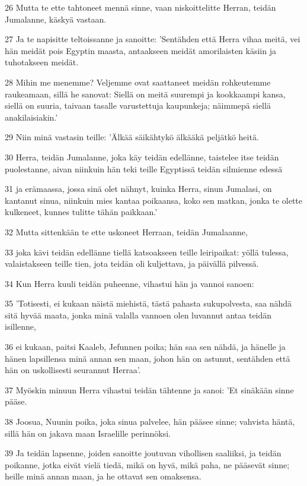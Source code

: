 \par 26 Mutta te ette tahtoneet mennä sinne, vaan niskoittelitte Herran, teidän Jumalanne, käskyä vastaan.
\par 27 Ja te napisitte teltoissanne ja sanoitte: 'Sentähden että Herra vihaa meitä, vei hän meidät pois Egyptin maasta, antaakseen meidät amorilaisten käsiin ja tuhotakseen meidät.
\par 28 Mihin me menemme? Veljemme ovat saattaneet meidän rohkeutemme raukeamaan, sillä he sanovat: Siellä on meitä suurempi ja kookkaampi kansa, siellä on suuria, taivaan tasalle varustettuja kaupunkeja; näimmepä siellä anakilaisiakin.'
\par 29 Niin minä vastasin teille: 'Älkää säikähtykö älkääkä peljätkö heitä.
\par 30 Herra, teidän Jumalanne, joka käy teidän edellänne, taistelee itse teidän puolestanne, aivan niinkuin hän teki teille Egyptissä teidän silmienne edessä
\par 31 ja erämaassa, jossa sinä olet nähnyt, kuinka Herra, sinun Jumalasi, on kantanut sinua, niinkuin mies kantaa poikaansa, koko sen matkan, jonka te olette kulkeneet, kunnes tulitte tähän paikkaan.'
\par 32 Mutta sittenkään te ette uskoneet Herraan, teidän Jumalaanne,
\par 33 joka kävi teidän edellänne tiellä katsoakseen teille leiripaikat: yöllä tulessa, valaistakseen teille tien, jota teidän oli kuljettava, ja päivällä pilvessä.
\par 34 Kun Herra kuuli teidän puheenne, vihastui hän ja vannoi sanoen:
\par 35 'Totisesti, ei kukaan näistä miehistä, tästä pahasta sukupolvesta, saa nähdä sitä hyvää maata, jonka minä valalla vannoen olen luvannut antaa teidän isillenne,
\par 36 ei kukaan, paitsi Kaaleb, Jefunnen poika; hän saa sen nähdä, ja hänelle ja hänen lapsillensa minä annan sen maan, johon hän on astunut, sentähden että hän on uskollisesti seurannut Herraa'.
\par 37 Myöskin minuun Herra vihastui teidän tähtenne ja sanoi: 'Et sinäkään sinne pääse.
\par 38 Joosua, Nuunin poika, joka sinua palvelee, hän pääsee sinne; vahvista häntä, sillä hän on jakava maan Israelille perinnöksi.
\par 39 Ja teidän lapsenne, joiden sanoitte joutuvan vihollisen saaliiksi, ja teidän poikanne, jotka eivät vielä tiedä, mikä on hyvä, mikä paha, ne pääsevät sinne; heille minä annan maan, ja he ottavat sen omaksensa.

